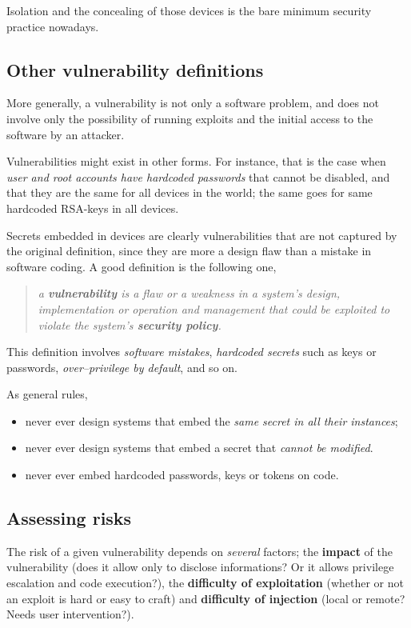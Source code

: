 \documentclass[10pt]{extbook}
\begin{document}
Isolation and the concealing of those devices is the bare minimum security
practice nowadays.


\subsection{Other vulnerability definitions}

More generally, a vulnerability is not only a software problem, and does not
involve only the possibility of running exploits and the initial access to the
software by an attacker.

Vulnerabilities might exist in other forms. For instance, that is the case when
\emph{user and root accounts have hardcoded passwords} that cannot be disabled,
and that they are the same for all devices in the world; the same goes for same
hardcoded RSA-keys in all devices.

Secrets embedded in devices are clearly vulnerabilities that are not captured
by the original definition, since they are more a design flaw than a mistake in
software coding. A good definition is the following one,

\begin{quote}
    \emph{a \textbf{vulnerability} is a flaw or a weakness in a system's
    design, implementation or operation and management that could be exploited
to violate the system's \textbf{security policy}.}
\end{quote}

This definition involves \emph{software mistakes}, \emph{hardcoded secrets}
such as keys or passwords, \emph{over--privilege by default}, and so on.

As general rules,
\begin{itemize}
    \item never ever design systems that embed the \emph{same secret in all
        their instances};
    \item never ever design systems that embed a secret that \emph{cannot be
        modified}.
    \item never ever embed hardcoded passwords, keys or tokens on code.
\end{itemize}

\subsection{Assessing risks}

The risk of a given vulnerability depends on \emph{several} factors; the
\textbf{impact} of the vulnerability (does it allow only to disclose
informations? Or it allows privilege escalation and code execution?), the \textbf{difficulty of exploitation} (whether or not an exploit is hard or easy to craft) and \textbf{difficulty of injection} (local or remote? Needs user intervention?).
\end{document}
